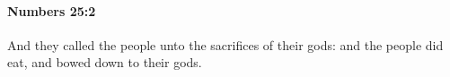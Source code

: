 
		\paragraph{Numbers 25:2} %
			\label{NUMBERS-25-2}

			And they called the people unto the sacrifices of their gods: and the people did eat, and bowed down to their gods.


